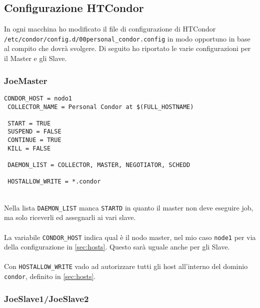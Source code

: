 \subsection{Configurazione HTCondor}

In ogni macchina ho modificato il file di configurazione di HTCondor \lstinline[style=cmd]|/etc/condor/config.d/00personal_condor.config| in modo opportuno in base al compito che dovr\`{a} svolgere. Di seguito ho riportato le varie configurazioni per il Master e gli Slave.


\subsubsection{JoeMaster}

\begin{lstlisting}[style=cmd]
 CONDOR_HOST = nodo1
 COLLECTOR_NAME = Personal Condor at $(FULL_HOSTNAME)
 
 START = TRUE
 SUSPEND = FALSE
 CONTINUE = TRUE
 KILL = FALSE
 
 DAEMON_LIST = COLLECTOR, MASTER, NEGOTIATOR, SCHEDD
 
 HOSTALLOW_WRITE = *.condor
\end{lstlisting}
\ \\
Nella lista \lstinline[style=cmd]|DAEMON_LIST| manca \lstinline[style=cmd]|STARTD| in quanto il master non deve eseguire job, ma solo riceverli ed assegnarli ai vari slave.\\
\ \\
La variabile \lstinline[style=cmd]|CONDOR_HOST| indica qual \`{e} il nodo master, nel mio caso \lstinline[style=cmd]|node1| per via della configurazione in \autoref{sec:hosts}. Questo sar\`{a} uguale anche per gli Slave.\\
\ \\
Con \lstinline[style=cmd]|HOSTALLOW_WRITE| vado ad autorizzare tutti gli host all'interno del dominio \lstinline[style=cmd]|condor|, definito in \autoref{sec:hosts}.
	
\subsubsection{JoeSlave1/JoeSlave2}
	
